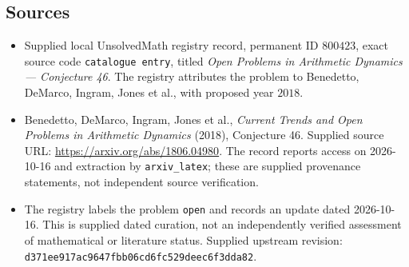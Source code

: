 \documentclass[11pt]{article}
\begin{document}
\subsection{Sources}
\begin{itemize}
\item Supplied local UnsolvedMath registry record, permanent ID \(800423\), exact source code \texttt{catalogue entry}, titled \emph{Open Problems in Arithmetic Dynamics --- Conjecture 46}. The registry attributes the problem to Benedetto, DeMarco, Ingram, Jones et al., with proposed year \(2018\).
\item Benedetto, DeMarco, Ingram, Jones et al., \emph{Current Trends and Open Problems in Arithmetic Dynamics} (2018), Conjecture 46. Supplied source URL: \url{https://arxiv.org/abs/1806.04980}. The record reports access on 2026-10-16 and extraction by \texttt{arxiv\_latex}; these are supplied provenance statements, not independent source verification.
\item The registry labels the problem \texttt{open} and records an update dated 2026-10-16. This is supplied dated curation, not an independently verified assessment of mathematical or literature status. Supplied upstream revision: \texttt{d371ee917ac9647fbb06cd6fc529deec6f3dda82}.
\end{itemize}
\end{document}
